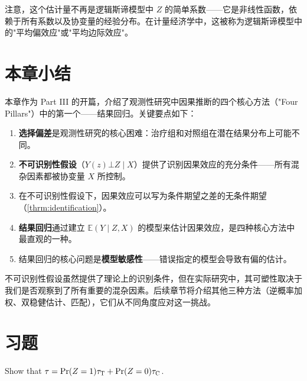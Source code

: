注意，这个估计量不再是逻辑斯谛模型中 $Z$ 的简单系数——它是非线性函数，依赖于所有系数以及协变量的经验分布。在计量经济学中，这被称为逻辑斯谛模型中的"平均偏效应"或"平均边际效应"。

\section{本章小结}\label{sec:10-summary}

本章作为 Part III 的开篇，介绍了观测性研究中因果推断的四个核心方法（"Four Pillars"）中的第一个——结果回归。关键要点如下：

\begin{enumerate}
  \item \textbf{选择偏差}是观测性研究的核心困难：治疗组和对照组在潜在结果分布上可能不同。
  \item \textbf{不可识别性假设}（$Y(z) \bot Z \mid X$）提供了识别因果效应的充分条件——所有混杂因素都被协变量 $X$ 所控制。
  \item 在不可识别性假设下，因果效应可以写为条件期望之差的无条件期望（\cref{thrm:identification}）。
  \item \textbf{结果回归}通过建立 $\mathbb{E}(Y \mid Z, X)$ 的模型来估计因果效应，是四种核心方法中最直观的一种。
  \item 结果回归的核心问题是\textbf{模型敏感性}——错误指定的模型会导致有偏的估计。
\end{enumerate}

不可识别性假设虽然提供了理论上的识别条件，但在实际研究中，其可塑性取决于我们是否观察到了所有重要的混杂因素。后续章节将介绍其他三种方法（逆概率加权、双稳健估计、匹配），它们从不同角度应对这一挑战。

\section{习题}\label{sec:10-homework}

\begin{HomeworkProblem}\label{exr:10-1}

Show that $\tau = \operatorname{Pr}(Z=1) \tau_\textsc{T} + \operatorname{Pr}(Z=0)\tau_\textsc{C}$.


\end{HomeworkProblem}

